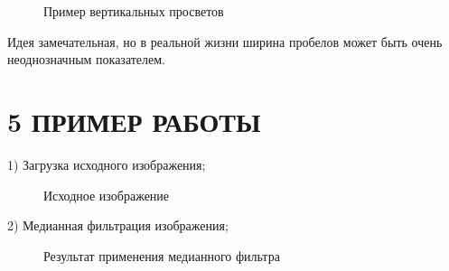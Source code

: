 \documentclass[14pt,a4paper]{extreport}
\begin{document}
 \begin{figure}[h!]
\caption{Пример вертикальных просветов}
\end{figure}

\hspace {4ex} Идея замечательная, но в реальной жизни ширина пробелов может быть очень неоднозначным показателем.

	\newpage
           \section*{\normalsize\hspace{4ex}5 ПРИМЕР РАБОТЫ}

\hspace {4ex} 1)	Загрузка исходного изображения;

 \begin{figure}[h!]
\caption{Исходное изображение}
\end{figure}

\hspace {4ex} 2)	Медианная фильтрация изображения;

 \begin{figure}[h!]
\caption{Результат применения медианного фильтра}
\end{figure}
\end{document}
